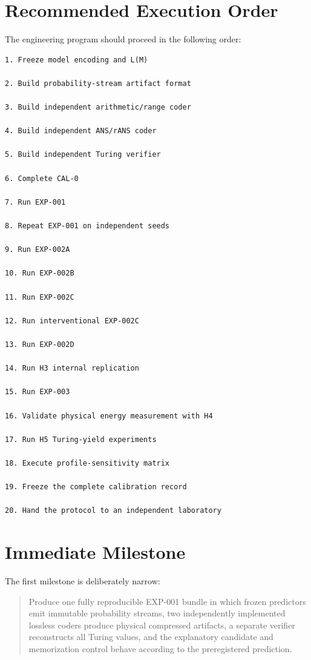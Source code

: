 \documentclass[11pt]{article}
\begin{document}
\section{Recommended Execution Order}

The engineering program should proceed in the following order:
\begin{verbatim}
1. Freeze model encoding and L(M)

2. Build probability-stream artifact format

3. Build independent arithmetic/range coder

4. Build independent ANS/rANS coder

5. Build independent Turing verifier

6. Complete CAL-0

7. Run EXP-001

8. Repeat EXP-001 on independent seeds

9. Run EXP-002A

10. Run EXP-002B

11. Run EXP-002C

12. Run interventional EXP-002C

13. Run EXP-002D

14. Run H3 internal replication

15. Run EXP-003

16. Validate physical energy measurement with H4

17. Run H5 Turing-yield experiments

18. Execute profile-sensitivity matrix

19. Freeze the complete calibration record

20. Hand the protocol to an independent laboratory
\end{verbatim}

\section{Immediate Milestone}

The first milestone is deliberately narrow:

\begin{quote}
Produce one fully reproducible EXP-001 bundle in which frozen predictors emit immutable probability streams, two independently implemented lossless coders produce physical compressed artifacts, a separate verifier reconstructs all Turing values, and the explanatory candidate and memorization control behave according to the preregistered prediction.
\end{quote}
\end{document}
